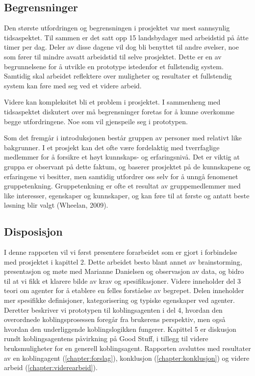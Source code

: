 \subsection{Begrensninger}

Den største utfordringen og begrensningen i prosjektet var mest sannsynlig tidsaspektet. Til sammen er det satt opp 15 landsbydager med arbeidstid på åtte timer per dag. Deler av disse dagene vil dog bli benyttet til andre øvelser, noe som fører til mindre avsatt arbeidstid til selve prosjektet. Dette er en av begrunnelsene for å utvikle en prototype istedenfor et fullstendig system. Samtidig skal arbeidet reflektere over muligheter og resultater et fullstendig system kan føre med seg ved et videre arbeid.

Videre kan kompleksitet bli et problem i prosjektet. I sammenheng med tidsaspektet diskutert over må begrensninger foretas for å kunne overkomme begge utfordringene. Noe som vil gjenspeile seg i prototypen.

Som det fremgår i introduksjonen består gruppen av personer med relativt like bakgrunner. I et prosjekt kan det ofte være fordelaktig med tverrfaglige medlemmer for å forsikre et høyt kunnskaps- og erfaringsnivå. Det er viktig at gruppa er observant på dette faktum, og baserer prosjektet på de kunnskapene og erfaringene vi besitter, men samtidig utfordrer oss selv for å unngå fenomenet gruppetenkning. Gruppetenkning er ofte et resultat av gruppemedlemmer med like interesser, egenskaper og kunnskaper, og kan føre til at første og antatt beste løsning blir valgt (Wheelan, 2009)\cite{effectiveTeams}.

\subsection{Disposisjon}

I denne rapporten vil vi først presentere forarbeidet som er gjort i forbindelse med prosjektet i kapittel 2. Dette arbeidet besto blant annet av brainstorming, presentasjon og møte med Marianne Danielsen og observasjon av data, og bidro til at vi fikk et klarere bilde av krav og spesifikasjoner. Videre inneholder del 3 teori om agenter for å etablere en felles forståelse av begrepet. Delen inneholder mer spesifikke definisjoner, kategorisering og typiske egenskaper ved agenter. Deretter beskriver vi prototypen til koblingsagenten i del 4, hvordan den overordnede koblingsprosessen foregår fra brukerens perspektiv, men også hvordan den underliggende koblingslogikken fungerer. Kapittel 5 er diskusjon rundt koblingsagentens påvirkning på Good Stuff, i tillegg til videre bruksmuligheter for en generell koblingsagent. Rapporten avsluttes med resultater av en koblingagent (\ref{chapter:forslag}), konklusjon (\ref{chapter:konklusjon}) og videre arbeid (\ref{chapter:viderearbeid}).
